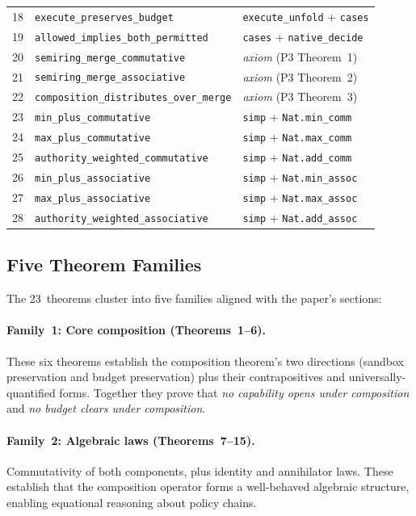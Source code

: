 \documentclass[sigconf]{acmart}
\begin{document}
\begin{table}[t]
\begin{tabular}{rll}
18 & \texttt{execute\_preserves\_budget}                 & \texttt{execute\_unfold} + \texttt{cases} \\
19 & \texttt{allowed\_implies\_both\_permitted}          & \texttt{cases} + \texttt{native\_decide} \\
20 & \texttt{semiring\_merge\_commutative}               & \emph{axiom} (P3 Theorem~1) \\
21 & \texttt{semiring\_merge\_associative}               & \emph{axiom} (P3 Theorem~2) \\
22 & \texttt{composition\_distributes\_over\_merge}      & \emph{axiom} (P3 Theorem~3) \\
23 & \texttt{min\_plus\_commutative}                     & \texttt{simp} + \texttt{Nat.min\_comm} \\
24 & \texttt{max\_plus\_commutative}                     & \texttt{simp} + \texttt{Nat.max\_comm} \\
25 & \texttt{authority\_weighted\_commutative}           & \texttt{simp} + \texttt{Nat.add\_comm} \\
26 & \texttt{min\_plus\_associative}                     & \texttt{simp} + \texttt{Nat.min\_assoc} \\
27 & \texttt{max\_plus\_associative}                     & \texttt{simp} + \texttt{Nat.max\_assoc} \\
28 & \texttt{authority\_weighted\_associative}           & \texttt{simp} + \texttt{Nat.add\_assoc} \\
\bottomrule
\end{tabular}
\end{table}

\subsection{Five Theorem Families}

The 23~theorems cluster into five families aligned with the paper's sections:

\paragraph{Family~1: Core composition (Theorems~1--6).}
These six theorems establish the composition theorem's two directions
(sandbox preservation and budget preservation) plus their contrapositives and
universally-quantified forms.  Together they prove that \emph{no capability
opens under composition} and \emph{no budget clears under composition}.

\paragraph{Family~2: Algebraic laws (Theorems~7--15).}
Commutativity of both components, plus identity and annihilator laws.
These establish that the composition operator forms a well-behaved algebraic
structure, enabling equational reasoning about policy chains.
\end{document}
